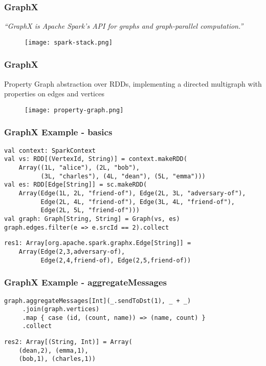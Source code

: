\documentclass{beamer}
\begin{document}
\begin{frame}
    \frametitle{GraphX}
    \begin{block}{}
        \emph{``GraphX is Apache Spark's API for graphs and graph-parallel computation.''}\footnotemark
    \end{block}
    \begin{figure}
        \texttt{[image: spark-stack.png]}
    \end{figure}
\end{frame}

\begin{frame}
    \frametitle{GraphX}
    \begin{block}{Property Graph}
        abstraction over RDDs, implementing a directed multigraph with properties on edges and vertices
    \end{block}
    \begin{figure}
        \texttt{[image: property-graph.png]}
    \end{figure}
\end{frame}

\begin{frame}[fragile]
    \frametitle{GraphX Example - basics}
    {\scriptsize
\begin{verbatim}
val context: SparkContext
val vs: RDD[(VertexId, String)] = context.makeRDD(
    Array((1L, "alice"), (2L, "bob"),
          (3L, "charles"), (4L, "dean"), (5L, "emma")))
val es: RDD[Edge[String]] = sc.makeRDD(
    Array(Edge(1L, 2L, "friend-of"), Edge(2L, 3L, "adversary-of"),
          Edge(2L, 4L, "friend-of"), Edge(3L, 4L, "friend-of"),
          Edge(2L, 5L, "friend-of")))
val graph: Graph[String, String] = Graph(vs, es)
graph.edges.filter(e => e.srcId == 2).collect
\end{verbatim}

\begin{verbatim}
res1: Array[org.apache.spark.graphx.Edge[String]] =
    Array(Edge(2,3,adversary-of),
          Edge(2,4,friend-of), Edge(2,5,friend-of))
\end{verbatim}
    }
\end{frame}

\begin{frame}[fragile]
    \frametitle{GraphX Example - aggregateMessages}
    {\scriptsize
\begin{verbatim}
graph.aggregateMessages[Int](_.sendToDst(1), _ + _)
     .join(graph.vertices)
     .map { case (id, (count, name)) => (name, count) }
     .collect
\end{verbatim}
\begin{verbatim}
res2: Array[(String, Int)] = Array(
    (dean,2), (emma,1),
    (bob,1), (charles,1))
\end{verbatim}
    }
\end{frame}
\end{document}
